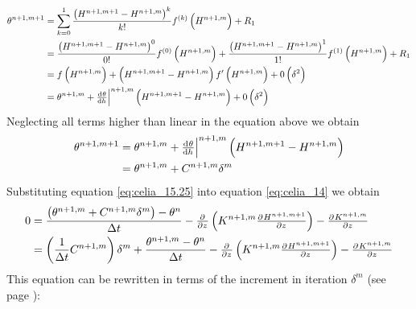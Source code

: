 \begin{align*}
  \theta^{n+1,m+1} &= \sum_{k=0}^1\frac{\del{ H^{n+1,m+1} - H^{n+1,m} }^k}{k!}f^{\del{ k }}\del{ H^{n+1,m} } + R_1 \\
                   &= \frac{\del{ H^{n+1,m+1} - H^{n+1,m} }^0}{0!} f^{\del{ 0 }}\del{ H^{n+1,m} } + \frac{\del{ H^{n+1,m+1} - H^{n+1,m} }^1}{1!} f^{\del{ 1 }}\del{ H^{n+1,m} } + R_1 \\
                   &= f\del{ H^{n+1,m} } + \del{ H^{n+1,m+1} - H^{n+1,m} } f'\del{ H^{n+1,m} } + 0 \del{ \delta^2 } \\
  \label{eq:celia_15}
                   &= \theta^{n+1,m} + \evalat{\od{\theta}{h}}{n+1,m} \del{ H^{n+1,m+1} - H^{n+1,m} } + 0 \del{ \delta^2 }
\end{align*}
Neglecting all terms higher than linear in the equation above we obtain
\begin{align}
  \theta^{n+1,m+1} &= \theta^{n+1,m} + \evalat{\od{\theta}{h}}{n+1,m} \del{ H^{n+1,m+1} - H^{n+1,m} } \\
  \label{eq:celia_15.25}
                   &= \theta^{n+1,m} + C^{n+1,m} \delta^m
\end{align}
Substituting equation \eqref{eq:celia_15.25} into equation \eqref{eq:celia_14} we obtain
\begin{align*}
  0 &= \frac{\del{\theta^{n+1,m} + C^{n+1,m} \delta^m} - \theta^n}{\Delta t} - \pd{}{z} \del{ K^{n+1,m}\pd{H^{n+1,m+1}}{z} } - \pd{K^{n+1,m}}{z} \\
  \label{eq:celia_15.5}
  &= \del{\frac{1}{\Delta t} C^{n+1,m}} \delta^m + \frac{\theta^{n+1,m}  - \theta^n}{\Delta t} - \pd{}{z} \del{ K^{n+1,m}\pd{H^{n+1,m+1}}{z} } - \pd{K^{n+1,m}}{z}
\end{align*}
This equation can be rewritten in terms of the increment in iteration $\delta ^m$ (see page \pageref{celia_15.5_transformation}):
\newpage
\label{celia_15.5_transformation}

